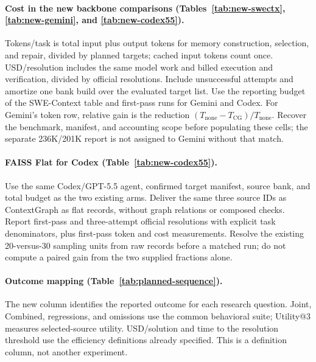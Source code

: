 \paragraph{Cost in the new backbone comparisons
(Tables~\ref{tab:new-swectx}, \ref{tab:new-gemini}, and \ref{tab:new-codex55}).}
Tokens/task is total input plus output tokens for memory construction,
selection, and repair, divided by planned targets; cached input tokens count
once. USD/resolution includes the same model work and billed execution and
verification, divided by official resolutions. Include unsuccessful attempts
and amortize one bank build over the evaluated target list. Use the reporting
budget of the SWE-Context table and first-pass runs for Gemini and Codex.
For Gemini's token row, relative gain is the reduction
$(T_{\mathrm{none}}-T_{\mathrm{CG}})/T_{\mathrm{none}}$.
Recover the benchmark, manifest, and accounting scope before populating these
cells; the separate 236K/201K report is not assigned to Gemini without that match.

\paragraph{FAISS Flat for Codex (Table~\ref{tab:new-codex55}).}
Use the same Codex/GPT-5.5 agent, confirmed target manifest, source bank, and
total budget as the two existing arms. Deliver the same three source IDs as
ContextGraph as flat records, without graph relations or composed checks.
Report first-pass and three-attempt official resolutions with explicit task
denominators, plus first-pass token and cost measurements. Resolve the
existing 20-versus-30 sampling units from raw records before a matched run;
do not compute a paired gain from the two supplied fractions alone.

\paragraph{Outcome mapping (Table~\ref{tab:planned-sequence}).}
The new column identifies the reported outcome for each research question.
Joint, Combined, regressions, and omissions use the common behavioral suite;
Utility@3 measures selected-source utility. USD/solution and time to the
resolution threshold use the efficiency definitions already specified.
This is a definition column, not another experiment.

